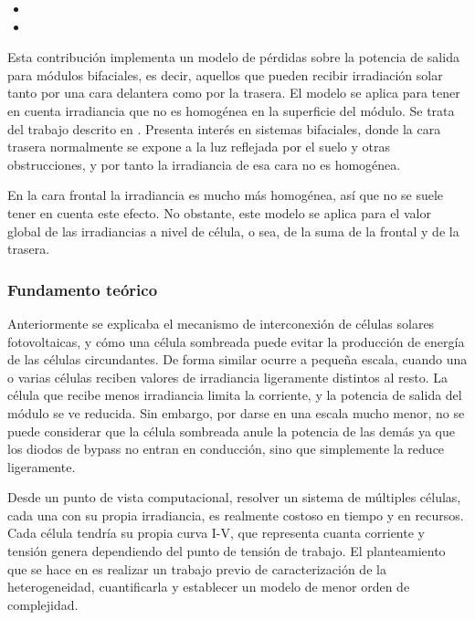\begin{itemize}
    \item {}
    \item {}
\end{itemize}

Esta contribución implementa un modelo de pérdidas sobre la potencia de salida para módulos bifaciales, es decir, aquellos que pueden recibir irradiación solar tanto por una cara delantera como por la trasera. El modelo se aplica para tener en cuenta irradiancia que no es homogénea en la superficie del módulo. Se trata del trabajo descrito en \cite{Deline_Ayala_Pelaez_MacAlpine_Olalla_2020}.
Presenta interés en sistemas bifaciales, donde la cara trasera normalmente se expone a la luz reflejada por el suelo y otras obstrucciones, y por tanto la irradiancia de esa cara no es homogénea.

En la cara frontal la irradiancia es mucho más homogénea, así que no se suele tener en cuenta este efecto. No obstante, este modelo se aplica para el valor global de las irradiancias a nivel de célula, o sea, de la suma de la frontal y de la trasera.

\subsubsection{Fundamento teórico}

Anteriormente se explicaba el mecanismo de interconexión de células solares fotovoltaicas, y cómo una célula sombreada puede evitar la producción de energía de las células circundantes. De forma similar ocurre a pequeña escala, cuando una o varias células reciben valores de irradiancia ligeramente distintos al resto. La célula que recibe menos irradiancia limita la corriente, y la potencia de salida del módulo se ve reducida. Sin embargo, por darse en una escala mucho menor, no se puede considerar que la célula sombreada anule la potencia de las demás ya que los diodos de bypass no entran en conducción, sino que simplemente la reduce ligeramente.

Desde un punto de vista computacional, resolver un sistema de múltiples células, cada una con su propia irradiancia, es realmente costoso en tiempo y en recursos. Cada célula tendría su propia curva I-V, que representa cuanta corriente y tensión genera dependiendo del punto de tensión de trabajo. El planteamiento que se hace en \cite{Deline_Ayala_Pelaez_MacAlpine_Olalla_2020} es realizar un trabajo previo de caracterización de la heterogeneidad, cuantificarla y establecer un modelo de menor orden de complejidad.

